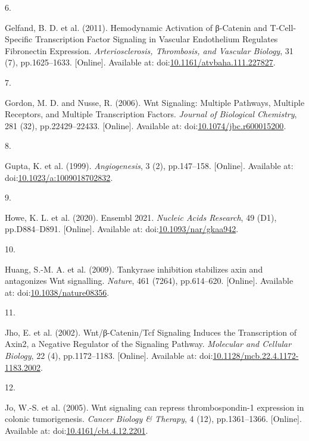 \documentclass[
  11pt,
]{article}
\newlength{\cslhangindent}
\newlength{\csllabelwidth}
\newlength{\cslentryspacingunit} %
\newenvironment{CSLReferences}[2] %
 {%
  \setlength{\parindent}{0pt}
  \ifodd #1
  \let\oldpar\par
  \def\par{\hangindent=\cslhangindent\oldpar}
  \fi
  \setlength{\parskip}{#2\cslentryspacingunit}
 }%
 {}
\newcommand{\CSLLeftMargin}[1]{\parbox[t]{\csllabelwidth}{#1}}
\newcommand{\CSLRightInline}[1]{\parbox[t]{\linewidth - \csllabelwidth}{#1}\break}
\begin{document}
\begin{CSLReferences}{0}{0}
\leavevmode{}%
\CSLLeftMargin{6. }
\CSLRightInline{Gelfand, B. D. {et al.} (2011). {Hemodynamic Activation of β-Catenin and T-Cell-Specific Transcription Factor Signaling in Vascular Endothelium Regulates Fibronectin Expression}. \emph{Arteriosclerosis, Thrombosis, and Vascular Biology}, 31 (7), pp.1625--1633. {[}Online{]}. Available at: doi:\href{https://doi.org/10.1161/atvbaha.111.227827}{10.1161/atvbaha.111.227827}.}

\leavevmode{}%
\CSLLeftMargin{7. }
\CSLRightInline{Gordon, M. D. and Nusse, R. (2006). {Wnt Signaling: Multiple Pathways, Multiple Receptors, and Multiple Transcription Factors}. \emph{Journal of Biological Chemistry}, 281 (32), pp.22429--22433. {[}Online{]}. Available at: doi:\href{https://doi.org/10.1074/jbc.r600015200}{10.1074/jbc.r600015200}.}

\leavevmode{}%
\CSLLeftMargin{8. }
\CSLRightInline{Gupta, K. {et al.} (1999). \emph{Angiogenesis}, 3 (2), pp.147--158. {[}Online{]}. Available at: doi:\href{https://doi.org/10.1023/a:1009018702832}{10.1023/a:1009018702832}.}

\leavevmode{}%
\CSLLeftMargin{9. }
\CSLRightInline{Howe, K. L. {et al.} (2020). {Ensembl 2021}. \emph{Nucleic Acids Research}, 49 (D1), pp.D884--D891. {[}Online{]}. Available at: doi:\href{https://doi.org/10.1093/nar/gkaa942}{10.1093/nar/gkaa942}.}

\leavevmode{}%
\CSLLeftMargin{10. }
\CSLRightInline{Huang, S.-M. A. {et al.} (2009). {Tankyrase inhibition stabilizes axin and antagonizes Wnt signalling}. \emph{Nature}, 461 (7264), pp.614--620. {[}Online{]}. Available at: doi:\href{https://doi.org/10.1038/nature08356}{10.1038/nature08356}.}

\leavevmode{}%
\CSLLeftMargin{11. }
\CSLRightInline{Jho, E. {et al.} (2002). {Wnt/β-Catenin/Tcf Signaling Induces the Transcription of Axin2, a Negative Regulator of the Signaling Pathway}. \emph{Molecular and Cellular Biology}, 22 (4), pp.1172--1183. {[}Online{]}. Available at: doi:\href{https://doi.org/10.1128/mcb.22.4.1172-1183.2002}{10.1128/mcb.22.4.1172-1183.2002}.}

\leavevmode{}%
\CSLLeftMargin{12. }
\CSLRightInline{Jo, W.-S. {et al.} (2005). {Wnt signaling can repress thrombospondin-1 expression in colonic tumorigenesis}. \emph{Cancer Biology \& Therapy}, 4 (12), pp.1361--1366. {[}Online{]}. Available at: doi:\href{https://doi.org/10.4161/cbt.4.12.2201}{10.4161/cbt.4.12.2201}.}


\end{CSLReferences}
\end{document}
